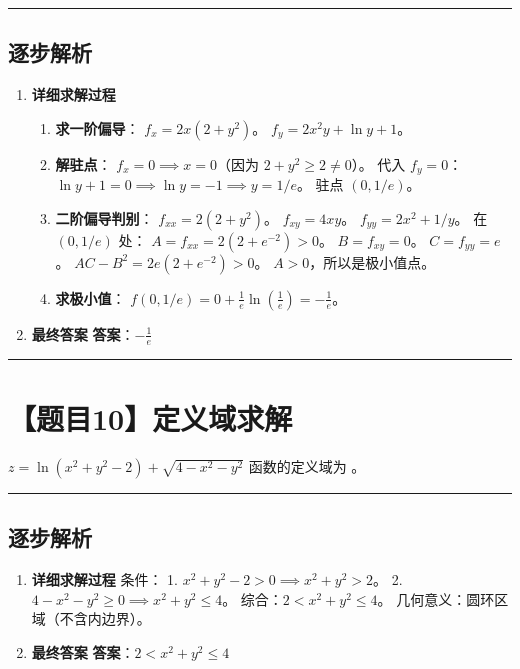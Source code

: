 \documentclass[UTF8]{ctexart}
\newenvironment{redenv}{\color{red}}{}
\newenvironment{detailedanalysis}{%
    \color{red}
    \begin{enumerate}[label=\textbf{第\arabic*步：}, leftmargin=*, align=left, itemsep=1.5ex]
}{%
    \end{enumerate}
}
\newcommand{\problemrule}{\noindent\rule{\textwidth}{1.5pt}\vspace{-0.8em}}
\newcommand{\analysisrule}{\noindent\rule{\textwidth}{0.8pt}\vspace{-0.8em}}
\newcommand{\blank}[1]{\underline{\hspace{#1}}}
\begin{document}
\begin{redenv}
\analysisrule
\subsection*{逐步解析}

\begin{detailedanalysis}
\item \textbf{详细求解过程}
\begin{enumerate}[label=(\arabic*)]
\item \textbf{求一阶偏导}：
$f_x = 2x(2+y^2)$。
$f_y = 2x^2 y + \ln y + 1$。
\item \textbf{解驻点}：
$f_x = 0 \implies x=0$（因为 $2+y^2 \ge 2 \neq 0$）。
代入 $f_y=0$：$\ln y + 1 = 0 \implies \ln y = -1 \implies y = 1/e$。
驻点 $(0, 1/e)$。
\item \textbf{二阶偏导判别}：
$f_{xx} = 2(2+y^2)$。
$f_{xy} = 4xy$。
$f_{yy} = 2x^2 + 1/y$。
在 $(0, 1/e)$ 处：
$A = f_{xx} = 2(2 + e^{-2}) > 0$。
$B = f_{xy} = 0$。
$C = f_{yy} = e$。
$AC - B^2 = 2e(2+e^{-2}) > 0$。
$A > 0$，所以是极小值点。
\item \textbf{求极小值}：
$f(0, 1/e) = 0 + \frac{1}{e} \ln(\frac{1}{e}) = -\frac{1}{e}$。
\end{enumerate}

\item \textbf{最终答案}
\textbf{答案}：$ -\frac{1}{e} $
\end{detailedanalysis}
\end{redenv}

\problemrule
\section*{【题目10】定义域求解}
$ z = \ln(x^{2} + y^{2} - 2) + \sqrt{4 - x^{2} - y^{2}} $ 函数的定义域为 \blank{2cm}。

\begin{redenv}
\analysisrule
\subsection*{逐步解析}

\begin{detailedanalysis}
\item \textbf{详细求解过程}
条件：
1. $x^2 + y^2 - 2 > 0 \implies x^2 + y^2 > 2$。
2. $4 - x^2 - y^2 \ge 0 \implies x^2 + y^2 \le 4$。
综合：$2 < x^2 + y^2 \le 4$。
几何意义：圆环区域（不含内边界）。

\item \textbf{最终答案}
\textbf{答案}：$ 2 < x^2 + y^2 \le 4 $
\end{detailedanalysis}
\end{redenv}
\end{document}
